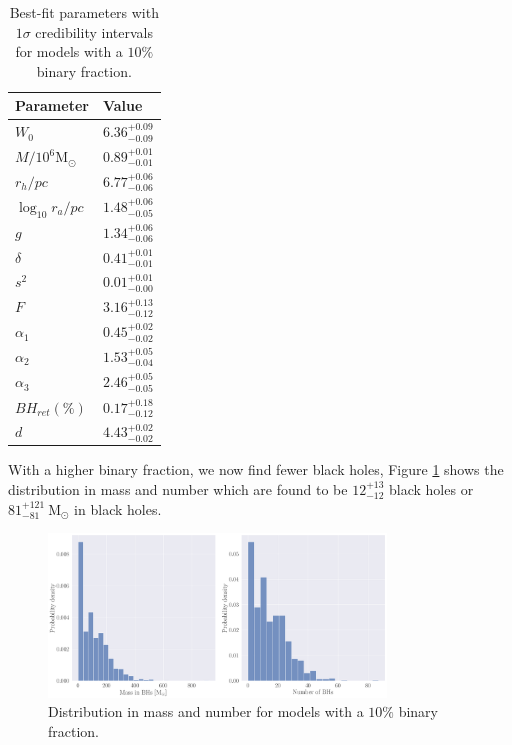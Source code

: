 \begin{table}
	\centering
	\caption{Best-fit parameters with $1\sigma$ credibility intervals for models with a $10\%$ binary fraction.}
	\begin{tabular}{l l}

		\hline
		Parameter                 & Value                  \\
		\hline
$W_0$                  & $6.36^{+0.09}_{-0.09}$ \\
		$M/10^6 \mathrm{M}_\odot$ & $0.89^{+0.01}_{-0.01}$ \\
		$r_h / pc$                & $6.77^{+0.06}_{-0.06}$ \\
$\log_{10}{r_a / pc}$     & $1.48^{+0.06}_{-0.05}$ \\
		$g$                       & $1.34^{+0.06}_{-0.06}$ \\
		$\delta$                  & $0.41^{+0.01}_{-0.01}$ \\
		$s^2$                     & $0.01^{+0.01}_{-0.00}$ \\
		$F$                       & $3.16^{+0.13}_{-0.12}$ \\
		$\alpha_1$                & $0.45^{+0.02}_{-0.02}$ \\
		$\alpha_2$                & $1.53^{+0.05}_{-0.04}$ \\
		$\alpha_3$                & $2.46^{+0.05}_{-0.05}$ \\
		$BH_{ret} (\%)$           & $0.17^{+0.18}_{-0.12}$ \\
		$d$                       & $4.43^{+0.02}_{-0.02}$ \\
		\hline
	\end{tabular}
	\label{tab:parameters_highbin}
\end{table}

With a higher binary fraction, we now find fewer black holes, Figure
\ref{fig:high_bin_model_BH_dists} shows the distribution in mass and number which are found to be
$12^{+13}_{-12}$ black holes or $81 ^{+121}_{-81} \ \mathrm{M}_\odot$ in black holes.


\begin{figure}
	\centering
	\includegraphics[width=0.8\textwidth]{figures/high_bin_model/BH_dists.png}
	\caption{Distribution in mass and number for models with a $10\%$ binary fraction.}
	\label{fig:high_bin_model_BH_dists}
\end{figure}


